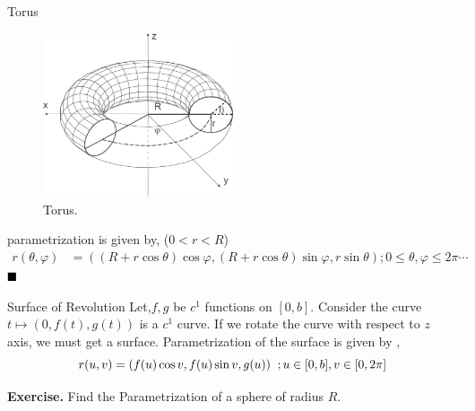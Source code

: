 \documentclass[../Analysis-3]{subfiles}
\begin{document}
\begin{Eg}{Torus}{}

    \begin{figure}[H]
        \centering
        \includegraphics[width=0.5\textwidth]{../figures/lec-24.3.png}
        \caption{Torus.}
    \end{figure}

    parametrization is given by, ($0<r<R$)
    \begin{align*} \label{eq:5}
        r(\theta , \varphi) & = ((R+r\cos \theta)\cos \varphi,(R+r\cos \theta)\sin \varphi , r \sin \theta) ; 0\le \theta , \varphi \le 2\pi \cdots
    \end{align*} $\hfill \blacksquare$
\end{Eg}

\begin{Eg}{Surface of Revolution}{}
    Let,$f,g$ be $c^1$ functions on $[0,b]$. Consider the curve $t \mapsto (0,f(t),g(t))$ is a $c^1$ curve. If we rotate the curve with respect to $z$ axis, we must get a surface. Parametrization  of the surface is given by ,
    \[r(u,v) = (f(u)\cos v,f(u)\sin v,g(u)) \hspace{0.2cm}; u \in [0,b] , v \in [0,2\pi] \]
\end{Eg}

\hspace*{0.5cm} \textbf{Exercise.} Find the Parametrization of a sphere of radius $R$.
\end{document}
